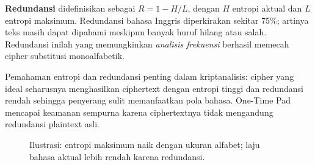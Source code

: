 \textbf{Redundansi} didefinisikan sebagai $R = 1 - H/L$, dengan $H$ entropi aktual dan $L$ entropi maksimum. Redundansi bahasa Inggris diperkirakan sekitar 75\%; artinya teks masih dapat dipahami meskipun banyak huruf hilang atau salah. Redundansi inilah yang memungkinkan \textit{analisis frekuensi} berhasil memecah cipher substitusi monoalfabetik.

Pemahaman entropi dan redundansi penting dalam kriptanalisis: cipher yang ideal seharusnya menghasilkan ciphertext dengan entropi tinggi dan redundansi rendah sehingga penyerang sulit memanfaatkan pola bahasa. One-Time Pad mencapai keamanan sempurna karena ciphertextnya tidak mengandung redundansi plaintext asli.

\begin{figure}[htbp]
\centering
{}
\caption{Ilustrasi: entropi maksimum naik dengan ukuran alfabet; laju bahasa aktual lebih rendah karena redundansi.}
\end{figure}
